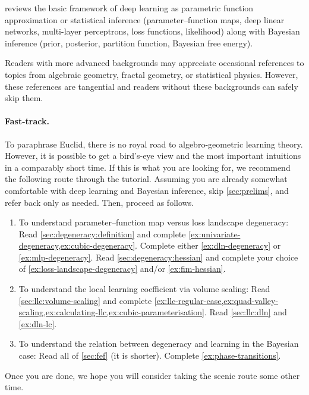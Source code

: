 \documentclass[11pt]{article}
\begin{document}
 reviews the basic framework of deep learning as parametric
function approximation or statistical inference (parameter--function maps, deep
linear networks, multi-layer perceptrons, loss functions, likelihood) along
with Bayesian inference (prior, posterior, partition function, Bayesian free
energy).

Readers with more advanced backgrounds may appreciate occasional references to
topics from algebraic geometry, fractal geometry, or statistical physics.
However, these references are tangential and readers without these backgrounds
can safely skip them.

\paragraph{Fast-track.}

To paraphrase Euclid, there is no royal road to algebro-geometric learning
theory. However, it is possible to get a bird's-eye view and the most important
intuitions in a comparably short time. If this is what you are looking for, we
recommend the following route through the tutorial. Assuming you are already
somewhat comfortable with deep learning and Bayesian inference, skip
\cref{sec:prelims}, and refer back only as needed. Then, proceed as follows.
\begin{enumerate}
    \item
        To understand parameter--function map versus loss landscape degeneracy:
        Read \cref{sec:degeneracy:definition} and complete
        \cref{ex:univariate-degeneracy,ex:cubic-degeneracy}.
        Complete either \cref{ex:dln-degeneracy} or \cref{ex:mlp-degeneracy}.
        Read \cref{sec:degeneracy:hessian} and complete your choice of
            \cref{ex:loss-landscape-degeneracy} and/or \cref{ex:fim-hessian}.
    \item
        To understand the local learning coefficient via volume scaling:
        Read \cref{sec:llc:volume-scaling} and complete
        \cref{ex:llc-regular-case,ex:quad-valley-scaling,ex:calculating-llc,ex:cubic-parameterisation}.
        Read \cref{sec:llc:dln} and \cref{ex:dln-lc}.
    \item
        To understand the relation between degeneracy and learning in the
        Bayesian case:
        Read all of \cref{sec:fef} (it is shorter).
        Complete \cref{ex:phase-transitions}.
\end{enumerate}
Once you are done, we hope you will consider taking the scenic route some other
time.
\end{document}
